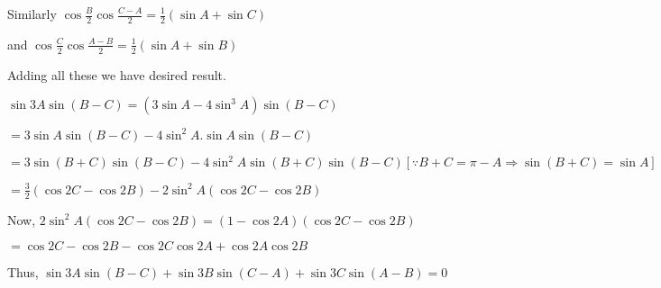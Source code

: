   Similarly $\cos\frac{B}{2}\cos\frac{C - A}{2} = \frac{1}{2}(\sin A + \sin C)$

  and $\cos\frac{C}{2}\cos\frac{A - B}{2} = \frac{1}{2}(\sin A + \sin B)$

  Adding all these we have desired result.

\item $\sin 3A\sin(B - C) = (3\sin A - 4\sin^3A)\sin(B - C)$

  $= 3\sin A\sin(B - C) - 4\sin^2A.\sin A\sin(B - C)$

  $= 3\sin(B + C)\sin(B - C) - 4\sin^2A\sin(B + C)\sin(B - C)[\because B + C = \pi - A \Rightarrow \sin(B + C) = \sin A]$

  $= \frac{3}{2}(\cos2C - \cos2B) - 2\sin^2A(\cos2C - \cos2B)$

  Now, $2\sin^2A(\cos2C - \cos2B) = (1 - \cos 2A)(\cos2C - \cos2B)$

  $= \cos 2C - \cos 2B - \cos2C \cos 2A + \cos 2A\cos 2B$

  Thus, $\sin 3A\sin(B - C) + \sin 3B\sin(C - A) + \sin3C\sin(A - B) = 0$
\stopitemize
